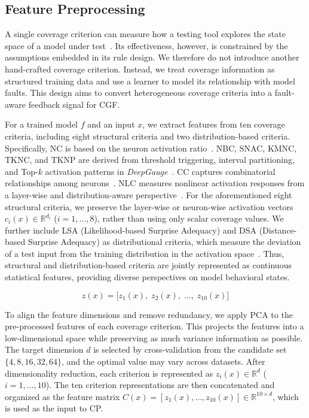 \documentclass[preprint,number,5p,twocolumn]{elsarticle}
\begin{document}
\subsection{Feature Preprocessing}\label{sec:feature}

A single coverage criterion can measure how a testing tool explores the state space of a model under test~\cite{YuanPW23}. Its effectiveness, however, is constrained by the assumptions embedded in its rule design. We therefore do not introduce another hand-crafted coverage criterion. Instead, we treat coverage information as structured training data and use a learner to model its relationship with model faults. This design aims to convert heterogeneous coverage criteria into a fault-aware feedback signal for CGF.

For a trained model $f$ and an input $x$, we extract features from ten coverage criteria, including eight structural criteria and two distribution-based criteria. Specifically, NC is based on the neuron activation ratio~\cite{PeiCYJ19}. NBC, SNAC, KMNC, TKNC, and TKNP are derived from threshold triggering, interval partitioning, and Top-$k$ activation patterns in \textit{DeepGauge}~\cite{MaJZSXLCSLLZW18}. CC captures combinatorial relationships among neurons~\cite{JiMYW23}. NLC measures nonlinear activation responses from a layer-wise and distribution-aware perspective~\cite{YuanPW23}. For the aforementioned eight structural criteria, we preserve the layer-wise or neuron-wise activation vectors $c_i(x) \in \mathbb{R}^{d_i}$ ($i = 1,\dots,8$), rather than using only scalar coverage values. We further include LSA (Likelihood-based Surprise Adequacy) and DSA (Distance-based Surprise Adequacy) as distributional criteria, which measure the deviation of a test input from the training distribution in the activation space~\cite{KimFY19}. Thus, structural and distribution-based criteria are jointly represented as continuous statistical features, providing diverse perspectives on model behavioral states.

\begin{equation}\label{eq:latent}
  z(x) = \bigl[z_1(x),\; z_2(x),\; \dots,\; z_{10}(x)\bigr]
\end{equation}

To align the feature dimensions and remove redundancy, we apply PCA to the pre-processed features of each coverage criterion. This projects the features into a low-dimensional space while preserving as much variance information as possible. The target dimension $d$ is selected by cross-validation from the candidate set $\{4, 8, 16, 32, 64\}$, and the optimal value may vary across datasets. After dimensionality reduction, each criterion is represented as $z_i(x) \in \mathbb{R}^{d}$ ($i = 1, \dots, 10$). The ten criterion representations are then concatenated and organized as the feature matrix $C(x) = [z_1(x), \dots, z_{10}(x)] \in \mathbb{R}^{10 \times d}$, which is used as the input to CP.
\end{document}

